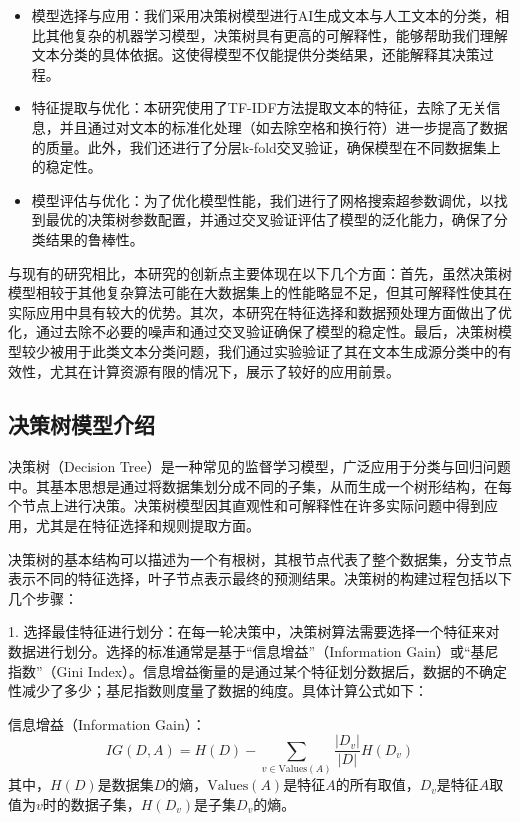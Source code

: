 \documentclass[UTF8]{ctexart}
\begin{document}
\begin{itemize}
    \item 模型选择与应用：我们采用决策树模型进行AI生成文本与人工文本的分类，相比其他复杂的机器学习模型，决策树具有更高的可解释性，能够帮助我们理解文本分类的具体依据。这使得模型不仅能提供分类结果，还能解释其决策过程。
    \item 特征提取与优化：本研究使用了TF-IDF方法提取文本的特征，去除了无关信息，并且通过对文本的标准化处理（如去除空格和换行符）进一步提高了数据的质量。此外，我们还进行了分层k-fold交叉验证，确保模型在不同数据集上的稳定性。
    \item 模型评估与优化：为了优化模型性能，我们进行了网格搜索超参数调优，以找到最优的决策树参数配置，并通过交叉验证评估了模型的泛化能力，确保了分类结果的鲁棒性。
    \end{itemize}

与现有的研究相比，本研究的创新点主要体现在以下几个方面：首先，虽然决策树模型相较于其他复杂算法可能在大数据集上的性能略显不足，但其可解释性使其在实际应用中具有较大的优势。其次，本研究在特征选择和数据预处理方面做出了优化，通过去除不必要的噪声和通过交叉验证确保了模型的稳定性。最后，决策树模型较少被用于此类文本分类问题，我们通过实验验证了其在文本生成源分类中的有效性，尤其在计算资源有限的情况下，展示了较好的应用前景。


\subsection{决策树模型介绍}

决策树（Decision Tree）是一种常见的监督学习模型，广泛应用于分类与回归问题中。其基本思想是通过将数据集划分成不同的子集，从而生成一个树形结构，在每个节点上进行决策。决策树模型因其直观性和可解释性在许多实际问题中得到应用，尤其是在特征选择和规则提取方面。

决策树的基本结构可以描述为一个有根树，其根节点代表了整个数据集，分支节点表示不同的特征选择，叶子节点表示最终的预测结果。决策树的构建过程包括以下几个步骤：

1. 选择最佳特征进行划分：在每一轮决策中，决策树算法需要选择一个特征来对数据进行划分。选择的标准通常是基于“信息增益”（Information Gain）或“基尼指数”（Gini Index）。信息增益衡量的是通过某个特征划分数据后，数据的不确定性减少了多少；基尼指数则度量了数据的纯度。具体计算公式如下：
   
   信息增益（Information Gain）：
   \[
   IG(D, A) = H(D) - \sum_{v \in \text{Values}(A)} \frac{|D_v|}{|D|} H(D_v)
   \]
   其中，\(H(D)\)是数据集\(D\)的熵，\(\text{Values}(A)\)是特征\(A\)的所有取值，\(D_v\)是特征\(A\)取值为\(v\)时的数据子集，\(H(D_v)\)是子集\(D_v\)的熵。
   
\end{document}
